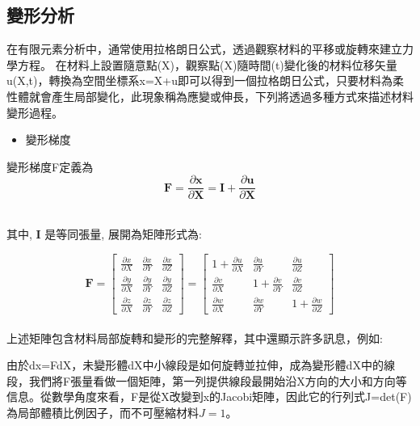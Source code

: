 \subsection{變形分析}

在有限元素分析中，通常使用拉格朗日公式，透過觀察材料的平移或旋轉來建立力學方程。
在材料上設置隨意點(X)，觀察點(X)隨時間(t)變化後的材料位移矢量u(X,t)，轉換為空間坐標系x=X+u即可以得到一個拉格朗日公式，只要材料為柔性體就會產生局部變化，此現象稱為應變或伸長，下列將透過多種方式來描述材料變形過程。\\

\begin{itemize}
\item 變形梯度
\end{itemize}

變形梯度F定義為
$$\mathbf{F}=\frac{\partial \mathbf{x}}{\partial \mathbf{X}}=\mathbf{I}+\frac{\partial \mathbf{u}}{\partial \mathbf{X}}$$\

其中, $\mathbf{I}$ 是等同張量, 展開為矩陣形式為:\

$$\mathbf{F}=\left[\begin{array}{lll}
\frac{\partial x}{\partial X} & \frac{\partial x}{\partial Y} & \frac{\partial x}{\partial Z} \\
\frac{\partial y}{\partial X} & \frac{\partial y}{\partial Y} & \frac{\partial y}{\partial Z} \\
\frac{\partial z}{\partial X} & \frac{\partial z}{\partial Y} & \frac{\partial z}{\partial Z}
\end{array}\right]=\left[\begin{array}{ccc}
1+\frac{\partial u}{\partial X} & \frac{\partial u}{\partial Y} & \frac{\partial u}{\partial Z} \\
\frac{\partial v}{\partial X} & 1+\frac{\partial v}{\partial Y} & \frac{\partial v}{\partial Z} \\
\frac{\partial w}{\partial X} & \frac{\partial w}{\partial Y} & 1+\frac{\partial w}{\partial Z}
\end{array}\right]$$
\\

上述矩陣包含材料局部旋轉和變形的完整解釋，其中還顯示許多訊息，例如:\

由於dx=FdX，未變形體dX中小線段是如何旋轉並拉伸，成為變形體dX中的線段，我們將F張量看做一個矩陣，第一列提供線段最開始沿X方向的大小和方向等信息。從數學角度來看，F是從X改變到x的Jacobi矩陣，因此它的行列式J=det(F)為局部體積比例因子，而不可壓縮材料$J=1$。\\

